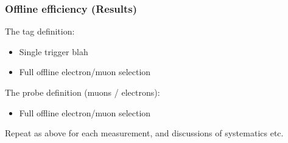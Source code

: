 \subsubsection{Offline efficiency (Results)}

The tag definition:
\begin{itemize}
	\item  Single trigger blah
	\item Full offline electron/muon selection
\end{itemize}
	
The probe definition (muons / electrons):
\begin{itemize}
	\item  Full offline electron/muon selection
\end{itemize}

Repeat as above for each measurement, and discussions of systematics etc.


